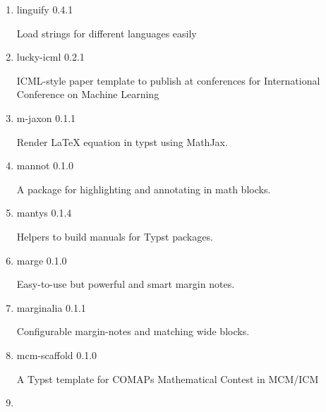 \begin{enumerate}
  { lineal } { 0.1.0 }

  Build elegent slide decks with Typst
\item
  \href{/universe/package/linguify/}{}

  { linguify } { 0.4.1 }

  Load strings for different languages easily
\item
  \href{/universe/package/lucky-icml/}{}


  { lucky-icml } { 0.2.1 }

  ICML-style paper template to publish at conferences for International
  Conference on Machine Learning
\item
  \href{/universe/package/m-jaxon/}{}

  { m-jaxon } { 0.1.1 }

  Render LaTeX equation in typst using MathJax.
\item
  \href{/universe/package/mannot/}{}

  { mannot } { 0.1.0 }

  A package for highlighting and annotating in math blocks.
\item
  \href{/universe/package/mantys/}{}


  { mantys } { 0.1.4 }

  Helpers to build manuals for Typst packages.
\item
  \href{/universe/package/marge/}{}

  { marge } { 0.1.0 }

  Easy-to-use but powerful and smart margin notes.
\item
  \href{/universe/package/marginalia/}{}

  { marginalia } { 0.1.1 }

  Configurable margin-notes and matching wide blocks.
\item
  \href{/universe/package/mcm-scaffold/}{}


  { mcm-scaffold } { 0.1.0 }

  A Typst template for COMAP\textquotesingle s Mathematical Contest in
  MCM/ICM
\item
  \href{/universe/package/meppp/}{}


\end{enumerate}
